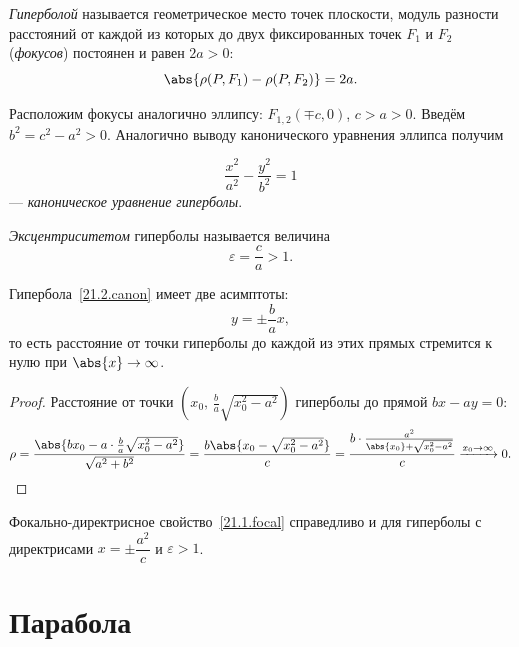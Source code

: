 \begin{defn}
\textit{Гиперболой} называется геометрическое место точек плоскости, модуль разности расстояний от каждой из которых до двух фиксированных точек $F_1$ и $F_2$ (\textit{фокусов}) постоянен и равен $2a > 0$:
\begin{equation}\label{21.2.def}
  \abs{\rho(P,F_1) - \rho(P,F_2)} = 2a.
\end{equation}
\end{defn}

Расположим фокусы аналогично эллипсу: $F_{1,2}(\mp c, 0)$, $c > a > 0$. Введём $b^2 = c^2 - a^2 > 0$. Аналогично выводу канонического уравнения эллипса получим

\begin{equation}\label{21.2.canon}
  \frac{x^2}{a^2} - \frac{y^2}{b^2} = 1
\end{equation}
--- \textit{каноническое уравнение гиперболы}.

\begin{defn}
\textit{Эксцентриситетом} гиперболы называется величина
\begin{equation}\label{21.2.exc}
  \varepsilon = \frac{c}{a} > 1.
\end{equation}
\end{defn}

\begin{thm}
Гипербола~\eqref{21.2.canon} имеет две асимптоты:
\begin{equation}\label{21.2.asymp}
  y = \pm \frac{b}{a} x,
\end{equation}
то есть расстояние от точки гиперболы до каждой из этих прямых стремится к нулю при $\abs{x} \to \infty$.
\end{thm}

\begin{proof}
Расстояние от точки $\left(x_0,\, \tfrac{b}{a}\sqrt{x_0^2-a^2}\right)$ гиперболы до прямой $bx - ay = 0$:
\[
\rho = \frac{\abs{bx_0 - a \cdot \tfrac{b}{a}\sqrt{x_0^2-a^2}}}{\sqrt{a^2+b^2}}
= \frac{b\abs{x_0 - \sqrt{x_0^2-a^2}}}{c}
= \frac{b \cdot \tfrac{a^2}{\abs{x_0}+\sqrt{x_0^2-a^2}}}{c}
\xrightarrow{x_0\to\infty} 0. \qedhere
\]
\end{proof}

\begin{notion}
Фокально-директрисное свойство~\eqref{21.1.focal} справедливо и для гиперболы с директрисами $x = \pm\dfrac{a^2}{c}$ и $\varepsilon > 1$.
\end{notion}

\section{Парабола}


